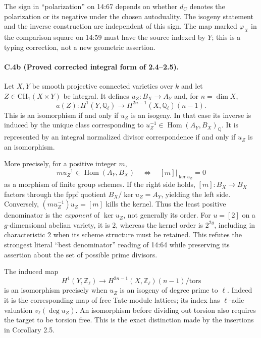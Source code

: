The sign in ``polarization'' on 14:67 depends on whether $d_C$ denotes
the polarization or its negative under the chosen autoduality. The
isogeny statement and the inverse construction are independent of this
sign. The map marked $\varphi_X$ in the comparison square on 14:59 must
have the source indexed by $Y$; this is a typing correction, not a new
geometric assertion.

\paragraph{C.4b (Proved corrected integral form of 2.4--2.5).}
Let $X,Y$ be smooth projective connected varieties over $k$ and let
$Z\in\mathrm{CH}_1(X\times Y)$ be integral. It defines
$u_Z:B_X\to A_Y$ and, for $n=\dim X$,
\[
 a(Z):H^1(Y,\mathbb Q_\ell)\longrightarrow
 H^{2n-1}(X,\mathbb Q_\ell)(n-1).
\]
This is an isomorphism if and only if $u_Z$ is an isogeny. In that case
its inverse is induced by the unique class corresponding to
$u_Z^{-1}\in\operatorname{Hom}(A_Y,B_X)_{\mathbb Q}$. It is represented
by an integral normalized divisor correspondence if and only if
$u_Z$ is an isomorphism.

More precisely, for a positive integer $m$,
\begin{equation}\label{eq:denominator-exponent}
 m u_Z^{-1}\in\operatorname{Hom}(A_Y,B_X)
 \quad\Longleftrightarrow\quad [m]|_{\ker u_Z}=0
\end{equation}
as a morphism of finite group schemes. If the right side holds,
$[m]:B_X\to B_X$ factors through the fppf quotient
$B_X/\ker u_Z=A_Y$, yielding the left side. Conversely,
$(m u_Z^{-1})u_Z=[m]$ kills the kernel. Thus the least positive
denominator is the \emph{exponent} of $\ker u_Z$, not generally its
order. For $u=[2]$ on a $g$-dimensional abelian variety, it is $2$,
whereas the kernel order is $2^{2g}$, including in characteristic $2$
when its scheme structure must be retained. This refutes the strongest
literal ``best denominator'' reading of 14:64 while preserving its
assertion about the set of possible prime divisors.

The induced map
\[
 H^1(Y,\mathbb Z_\ell)\longrightarrow
 H^{2n-1}(X,\mathbb Z_\ell)(n-1)/\mathrm{tors}
\]
is an isomorphism precisely when $u_Z$ is an isogeny of degree prime
to $\ell$. Indeed it is the corresponding map of free Tate-module
lattices; its index has $\ell$-adic valuation
$v_\ell(\deg u_Z)$. An isomorphism before dividing out torsion also
requires the target to be torsion free. This is the exact distinction
made by the insertions in Corollary 2.5.

